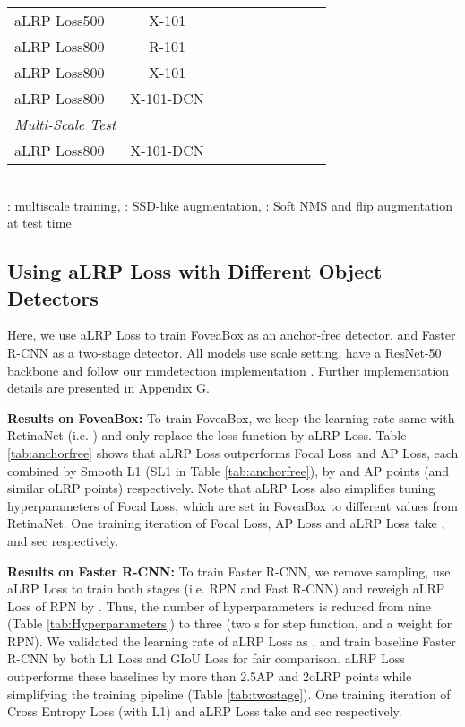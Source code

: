 \documentclass{article}
\begin{document}
\begin{table}[t]
\begin{tabular}{|l|c|c|c|c|c|c|c|c|c|}
aLRP Loss500&X-101&&&&&&&&  \\
aLRP Loss800&R-101&&&&&&&&\\ 
aLRP Loss800&X-101&&&&&&&& \\ 
        aLRP Loss800&X-101-DCN&&&&&&&& \\ 
        \hline
\hhline{==========}
        \textit{Multi-Scale Test}& & & & & & & & &\\
        aLRP Loss800&X-101-DCN&&&&&&&&\\ 
        \hline        
    \end{tabular}
    {\\ \footnotesize : multiscale training, : SSD-like augmentation, : Soft NMS \cite{SoftNMS} and flip augmentation at test time}
\end{table}

\subsection{Using aLRP Loss with Different Object Detectors}
Here, we use aLRP Loss to train FoveaBox \cite{FoveaBox} as an anchor-free detector, and Faster R-CNN \cite{FasterRCNN} as a two-stage detector. All models use  scale setting, have a ResNet-50 backbone and follow our mmdetection implementation \cite{mmdetection}. Further implementation details are presented in Appendix G.



\textbf{Results on FoveaBox:} To train FoveaBox, we keep the learning rate same with RetinaNet (i.e. ) and only replace the loss function by aLRP Loss. Table \ref{tab:anchorfree} shows that aLRP Loss outperforms Focal Loss and AP Loss, each combined by Smooth L1 (SL1 in Table \ref{tab:anchorfree}), by  and  AP points (and similar oLRP points) respectively. Note that aLRP Loss also simplifies tuning hyperparameters of Focal Loss, which are set in FoveaBox to different values from RetinaNet. One training iteration of Focal Loss, AP Loss and aLRP Loss take ,  and  sec respectively.

\textbf{Results on Faster R-CNN:} To train Faster R-CNN, we remove sampling, use aLRP Loss to train both stages (i.e. RPN and Fast R-CNN) and reweigh aLRP Loss of RPN by . Thus, the number of hyperparameters is reduced from nine (Table \ref{tab:Hyperparameters}) to three (two s for step function, and a weight for RPN). We validated the learning rate of aLRP Loss as , and train baseline Faster R-CNN by both L1 Loss and GIoU Loss for fair comparison. aLRP Loss outperforms these baselines by more than 2.5AP and 2oLRP points while simplifying the training pipeline (Table \ref{tab:twostage}). One training iteration of Cross Entropy Loss (with L1) and aLRP Loss take  and  sec respectively.
\end{document}
